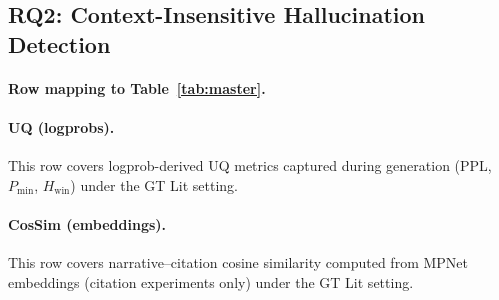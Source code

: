 \subsection{RQ2: Context-Insensitive Hallucination Detection}
\label{sec:rq2_experiments}

\paragraph{Row mapping to Table~\ref{tab:master}.}
\paragraph{UQ (logprobs).}\label{sec:rq2_uq_logprobs}
This row covers logprob-derived UQ metrics captured during generation (PPL, $P_{\min}$, $H_{\text{win}}$) under the GT Lit setting.

\paragraph{CosSim (embeddings).}\label{sec:rq2_cossim_embeddings}
This row covers narrative--citation cosine similarity computed from MPNet embeddings (citation experiments only) under the GT Lit setting.

